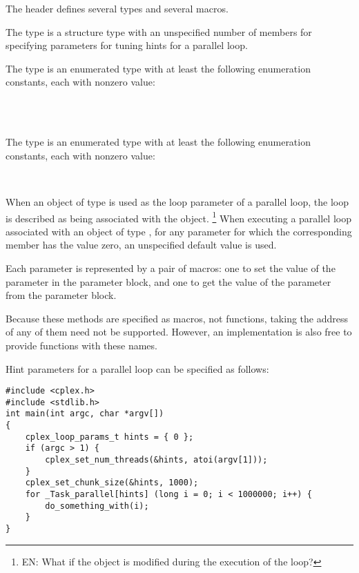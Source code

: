 

\pnum
The header
defines several types and several macros.

\pnum
The
type is a structure type
with an unspecified number of members
for specifying parameters for tuning hints for a parallel loop.

\pnum
The
type is an enumerated type
with at least the following enumeration constants,
each with nonzero value:

\begin{ttfamily}
\\
\\
\end{ttfamily}

\pnum
The
type is an enumerated type
with at least the following enumeration constants,
each with nonzero value:

\begin{ttfamily}
\\
\end{ttfamily}

\pnum
When an object of type
is used as the loop parameter of a parallel loop,
the loop is described as being associated with the object.%
\footnote{EN:
What if the object is modified during the execution of the loop?
}
When executing a parallel loop associated with an object of type
,
for any parameter for which the corresponding member has the value zero,
an unspecified default value is used.

\pnum
Each parameter is represented by a pair of macros:
one to set the value of the parameter in the parameter block,
and one to get the value of the parameter from the parameter block.

\begin{note}
Because these methods are specified as macros,
not functions,
taking the address of any of them need not be supported.
However, an implementation is also free
to provide functions with these names.
\end{note}

\begin{example}
Hint parameters for a parallel loop can be specified as follows:
\begin{verbatim}
#include <cplex.h>
#include <stdlib.h>
int main(int argc, char *argv[])
{
    cplex_loop_params_t hints = { 0 };
    if (argc > 1) {
        cplex_set_num_threads(&hints, atoi(argv[1]));
    }
    cplex_set_chunk_size(&hints, 1000);
    for _Task_parallel[hints] (long i = 0; i < 1000000; i++) {
        do_something_with(i);
    }
}
\end{verbatim}
\end{example}


